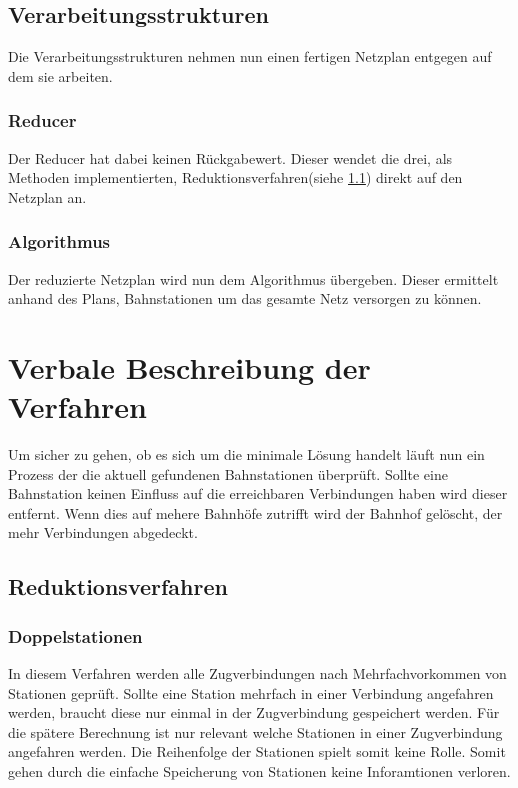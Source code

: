 \subsection{Verarbeitungsstrukturen}\label{ver:subsec:verarbeitungsstrukturen}
Die Verarbeitungsstrukturen nehmen nun einen fertigen Netzplan entgegen auf dem sie arbeiten.\\

\subsubsection{Reducer}\label{ver:subsubsec:reducer}
Der Reducer hat dabei keinen Rückgabewert. Dieser wendet die drei, als Methoden implementierten, Reduktionsverfahren(siehe \ref{ver:subsec:reduktionsverfahren}) direkt auf den Netzplan an.\\

\subsubsection{Algorithmus}\label{ver:subsubsec:algorithmus}
Der reduzierte Netzplan wird nun dem Algorithmus übergeben. Dieser ermittelt anhand des Plans, Bahnstationen um das gesamte Netz versorgen zu können.

\section{Verbale Beschreibung der Verfahren}\label{ver:sec:verfahren}
Um sicher zu gehen, ob es sich um die minimale Lösung handelt läuft nun ein Prozess der die aktuell gefundenen Bahnstationen überprüft. Sollte eine Bahnstation keinen Einfluss auf die erreichbaren Verbindungen haben wird dieser entfernt. Wenn dies auf mehere Bahnhöfe zutrifft wird der Bahnhof gelöscht, der mehr Verbindungen abgedeckt.\\

\subsection{Reduktionsverfahren}\label{ver:subsec:reduktionsverfahren}
\subsubsection{Doppelstationen}\label{ver:subsubsec:doppelstationen}
In diesem Verfahren werden alle Zugverbindungen nach Mehrfachvorkommen von Stationen geprüft. Sollte eine Station mehrfach in einer Verbindung angefahren werden, braucht diese nur einmal in der Zugverbindung gespeichert werden. Für die spätere Berechnung ist nur relevant welche Stationen in einer Zugverbindung angefahren werden. Die Reihenfolge der Stationen spielt somit keine Rolle. Somit gehen durch die einfache Speicherung von Stationen keine Inforamtionen verloren.\\

